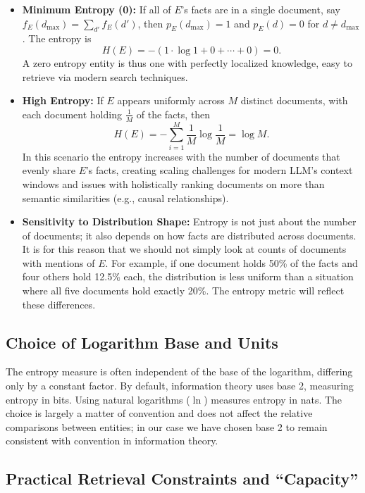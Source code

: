 \documentclass[11pt,a4paper]{article}
\begin{document}
\begin{itemize}
\item \textbf{Minimum Entropy (0):} If all of $E$'s facts are in a single document, say $f_{E}(d_{\text{max}}) = \sum_{d'} f_{E}(d')$, then $p_{E}(d_{\text{max}})=1$ and $p_{E}(d) = 0$ for $d \neq d_{\text{max}}$. The entropy is
\[
H(E) = -(1 \cdot \log 1 + 0 + \cdots + 0) = 0.
\]
A zero entropy entity is thus one with perfectly localized knowledge, easy to retrieve via modern search techniques.

\item \textbf{High Entropy:} If $E$ appears uniformly across $M$ distinct documents, with each document holding $\frac{1}{M}$ of the facts, then
\[
H(E) = -\sum_{i=1}^{M} \frac{1}{M} \log \frac{1}{M} = \log M.
\]
In this scenario the entropy increases with the number of documents that evenly share $E$'s facts, creating scaling challenges for modern LLM's context windows and issues with holistically ranking documents on more than semantic similarities (e.g., causal relationships).

\item \textbf{Sensitivity to Distribution Shape:} Entropy is not just about the number of documents; it also depends on how facts are distributed across documents. It is for this reason that we should not simply look at counts of documents with mentions of $E$. For example, if one document holds 50\% of the facts and four others hold 12.5\% each, the distribution is less uniform than a situation where all five documents hold exactly 20\%. The entropy metric will reflect these differences.
\end{itemize}

\subsection{Choice of Logarithm Base and Units}

The entropy measure is often independent of the base of the logarithm, differing only by a constant factor. By default, information theory uses base 2, measuring entropy in bits. Using natural logarithms ($\ln$) measures entropy in nats. The choice is largely a matter of convention and does not affect the relative comparisons between entities; in our case we have chosen base 2 to remain consistent with convention in information theory.

\subsection{Practical Retrieval Constraints and ``Capacity''}
\end{document}

